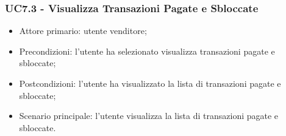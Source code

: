\subsubsection{UC7.3 - Visualizza Transazioni Pagate e Sbloccate}

\begin{itemize}
    \item Attore primario: utente venditore;
    \item Precondizioni: l'utente ha selezionato visualizza transazioni pagate e sbloccate;
    \item Postcondizioni: l'utente ha visualizzato la lista di transazioni pagate e sbloccate;
    \item Scenario principale: l'utente visualizza la lista di transazioni pagate e sbloccate.
\end{itemize}
\clearpage
